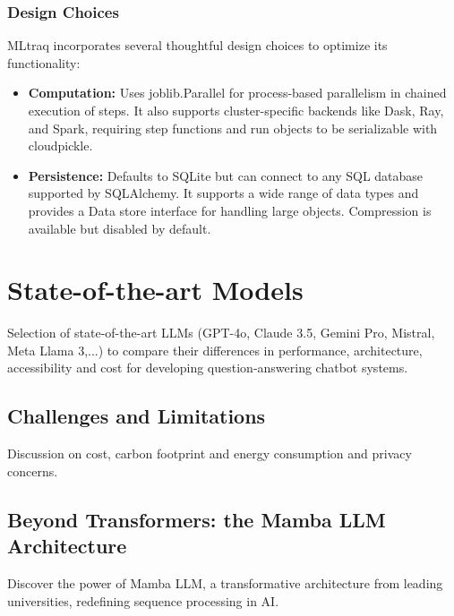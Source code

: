 \subsubsection{Design Choices}

MLtraq incorporates several thoughtful design choices to optimize its functionality:

\begin{itemize}
    \item \textbf{Computation:} Uses joblib.Parallel for process-based parallelism in chained execution of steps. It also supports cluster-specific backends like Dask, Ray, and Spark, requiring step functions and run objects to be serializable with cloudpickle.
    \item \textbf{Persistence:} Defaults to SQLite but can connect to any SQL database supported by SQLAlchemy. It supports a wide range of data types and provides a Data store interface for handling large objects. Compression is available but disabled by default.
\end{itemize}


\newpage

\section{State-of-the-art Models}
Selection of state-of-the-art LLMs (GPT-4o, Claude 3.5, Gemini Pro, Mistral, Meta Llama 3,...) to compare their differences in performance, architecture, accessibility and cost for developing question-answering chatbot systems.

\subsection{Challenges and Limitations}
Discussion on cost, carbon footprint and energy consumption and privacy concerns.

\subsection{Beyond Transformers: the Mamba LLM Architecture}
Discover the power of Mamba LLM, a transformative architecture from leading universities, redefining sequence processing in AI.

